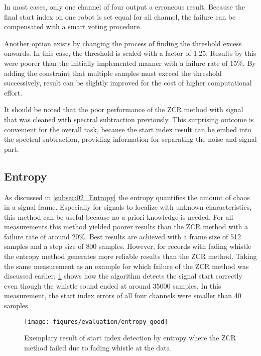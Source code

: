 In most cases, only one channel of four output a erroneous result.
Because the final start index on one robot is set equal for all channel,
the failure can be compensated with a smart voting procedure.

Another option exists by changing the process of finding the
threshold excess onwards.
In this case, the threshold is scaled with a factor of 1.25.
Results by this were poorer than the initially implemented manner
with a failure rate of 15\si{\percent}.
By adding the constraint that multiple samples must exceed the
threshold successively, result can be slightly improved for the cost of higher
computational effort.

It should be noted that the poor performance of the \ac{ZCR} method with signal that
was cleaned with spectral subtraction previously. This surprising outcome is
convenient for the overall task, because the start index result can be embed
into the spectral subtraction, providing information for separating the noise
and signal part.

\subsection{Entropy}
\label{subsec:04_entropy}

As discussed in \cref{subsec:02_Entropy} the entropy quantifies the amount
of chaos in a signal frame.
Especially for signals to localize with unknown characteristics,
this method can be useful because no a priori knowledge is needed.
For all measurements this method yielded poorer results than the \ac{ZCR} method
with a failure rate of around 20\si{\percent}.
Best results are achieved with a frame size of 512 samples and a step size of 800
samples.
However, for records with fading whistle the entropy method
generates more reliable results than the \ac{ZCR} method.
Taking the same measurement as an example for which failure of the \ac{ZCR} method
was discussed earlier, \cref{fig:04_entropyGood} shows how the algorithm
detects the signal start correctly even though the whistle sound ended at
around 35000 samples. In this measurement, the start index errors of all four
channels were smaller than 40 samples.
\begin{figure}[ht]
	\centering
	\texttt{[image: figures/evaluation/entropy\_good]}
	\caption{Exemplary result of start index detection by entropy where
			the \ac{ZCR} method failed due to fading whistle
			at the data.}
	\label{fig:04_entropyGood}
\end{figure}

